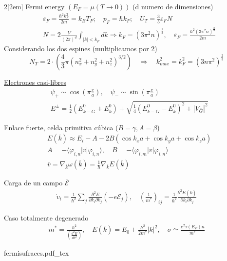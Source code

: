 \documentclass[leqno]{article}
\newcommand{\incfig}[1]{%
\begin{center}
\def\svgwidth{0.9\columnwidth}
{#1.pdf_tex}
\end{center}
}
\begin{document}
\begin{multicols}{2}[\columnsep2em]
Fermi energy $(E_F = \mu (T\to 0))$ (d numero de dimensiones)
\begin{align*}
&\varepsilon _F = \frac{\hbar ^2k_F^2}{2m}=k_BT_F; \quad p_F = \hbar k_F; \quad U_T=\frac{3}{5}\varepsilon _FN \\
&N = 2 \frac{V}{(2\pi)^d}\int _{|k|<k_F} dk \Rightarrow k_F = (3\pi ^2n)^{\frac{1}{3}}, \quad \varepsilon _F = \frac{\hbar ^2(3\pi ^2n)^{\frac{2}{3}}}{2m}
\end{align*}
Considerando los dos espines (multiplicamos por 2)
\[
N_T = 2 \cdot \left( \frac{4}{3}\pi (n_x^2+n_y^2+n_z^2)^{3 / 2} \right) \quad \Rightarrow \quad k_{max}^2 = k_F^2 = (3n\pi ^2) ^{ \frac{2}{3}}
\]


\underline{Electrones casi-libres}
\begin{align*}
  &\psi _+ \sim \cos (\pi \frac{x}{a}), \quad \psi _- \sim  \sin(\pi \frac{x}{a})\\
  &E^{\pm} = \frac{1}{2}(E^0_{\overline{k}-\overline{G}} + E^0_{\overline{k}})\pm \sqrt{\frac{1}{4}(E^0_{{\overline{k}}-\overline{G}}-E^0_{\overline{k}})^2 + |V_{\overline{G}}|^2} 
\end{align*}

\underline{Enlace fuerte, celda primitiva cúbica} ($B=\gamma, A = \beta $)
\begin{align*}
  &E(\overline{k}) \approx E_i-A-2B (\cos k_xa + \cos k_ya + \cos k_za)\\
  &A = -\langle \varphi _{i, n} | v | \varphi _{i,n} \rangle , \quad 
  B = -\langle \varphi _{i, m} | v | \varphi _{i,n} \rangle\\
  &\overline{v} = \nabla _{\overline{k}} \omega (\overline{k}) = \frac{1}{\hbar}\nabla _{\overline{k}}E(\overline{k})
\end{align*}

Carga de un campo $\overline{\mathcal{E}}$
\begin{align*}
  \dot{v}_i = \frac{1}{\hbar ^2}\sum_{j} \frac{\partial^2E}{\partial k_i\partial k_j} (-e\mathcal{E}_j), \quad \left( \frac{1}{m^*} \right)_{ij} = \frac{1}{\hbar ^2} \frac{\partial ^2E(\overline{k})}{\partial k_i\partial k_j}
\end{align*}

Caso totalmente degenerado
\begin{align*}
  m^* = \frac{\hbar ^2}{\left( \frac{d^2E}{dk^2} \right) }, \quad E(\overline{k}) = E_0 + \frac{\hbar^2}{2m^*}|k|^2, \quad \sigma \simeq \frac{e^2\tau (E_F)n}{m^*}
\end{align*}

\incfig{fermisufraces}


\end{multicols}
\end{document}
